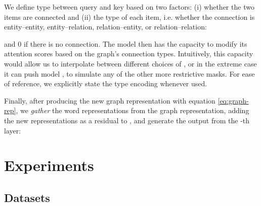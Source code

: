 \documentclass[11pt]{article}
\begin{document}
We define type  between query  and key  based on two factors: (i) whether the two items are connected and (ii) the type of each item, i.e. whether the connection is entity--entity, entity--relation, relation--entity, or relation--relation:

and 0 if there is no connection.
The model then has the capacity to modify its attention scores based on the graph's connection types. Intuitively, this capacity would allow us to interpolate between different choices of , or in the extreme case it can push model , to simulate any of the other more restrictive masks.
For ease of reference, we explicitly state the type encoding whenever used.


Finally, after producing the new graph representation  with equation \eqref{eq:graph-rep}, we \emph{gather} the word representations from the graph representation, adding the new representations as a residual to , and generate the output from the -th layer:



\section{Experiments}
\subsection{Datasets}



\begin{table}[]
\centering
{}
\caption{\label{tab:datasetstats} Statistics of the supervised KG-to-Text datasets used for experimenting.}
\end{table}
\end{document}
